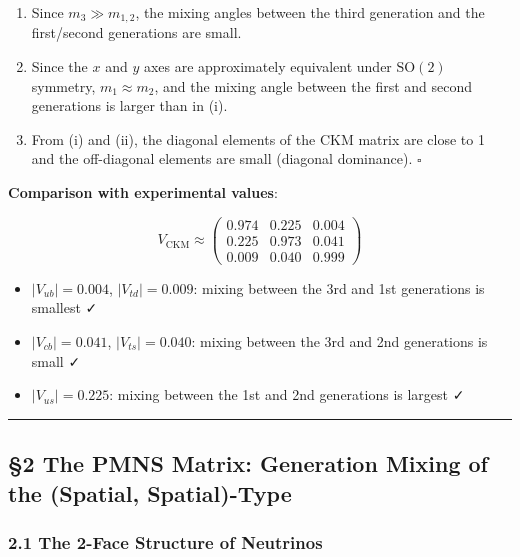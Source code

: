 \documentclass[
  a4paper,11pt]{article}
\providecommand{\tightlist}{%
  \setlength{\itemsep}{0pt}\setlength{\parskip}{0pt}}
\begin{document}
\begin{enumerate}
\def\labelenumi{(\roman{enumi})}
\item
  Since \(m_3 \gg m_{1,2}\), the mixing angles between the third
  generation and the first/second generations are small.
\item
  Since the \(x\) and \(y\) axes are approximately equivalent under
  \(\mathrm{SO}(2)\) symmetry, \(m_1 \approx m_2\), and the mixing angle
  between the first and second generations is larger than in (i).
\item
  From (i) and (ii), the diagonal elements of the CKM matrix are close
  to 1 and the off-diagonal elements are small (diagonal dominance).
  \(\square\)
\end{enumerate}

\textbf{Comparison with experimental values}:

\[V_{\text{CKM}} \approx \begin{pmatrix} 0.974 & 0.225 & 0.004 \\ 0.225 & 0.973 & 0.041 \\ 0.009 & 0.040 & 0.999 \end{pmatrix}\]

\begin{itemize}
\tightlist
\item
  \(|V_{ub}| = 0.004\), \(|V_{td}| = 0.009\): mixing between the 3rd and
  1st generations is smallest ✓
\item
  \(|V_{cb}| = 0.041\), \(|V_{ts}| = 0.040\): mixing between the 3rd and
  2nd generations is small ✓
\item
  \(|V_{us}| = 0.225\): mixing between the 1st and 2nd generations is
  largest ✓
\end{itemize}

\begin{center}\rule{0.5\linewidth}{0.5pt}\end{center}

\subsection{§2 The PMNS Matrix: Generation Mixing of the (Spatial,
Spatial)-Type}\label{the-pmns-matrix-generation-mixing-of-the-spatial-spatial-type}

\subsubsection{2.1 The 2-Face Structure of
Neutrinos}\label{the-2-face-structure-of-neutrinos}
\end{document}
